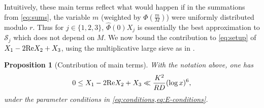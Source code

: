 \documentclass[reqno,11pt]{amsart}
\newtheorem{proposition}[theorem]{Proposition}
\theoremstyle{definition}
\theoremstyle{remark}
\numberwithin{equation}{section}
\newcommand{\mS}{\mathcal{S}}
\renewcommand{\Re}{\textnormal{Re}}
\renewcommand{\hat}{\widehat}
\begin{document}
Intuitively, these main terms reflect what would happen if in the summations from \cref{eq:sums}, the variable $m$ (weighted by $\Phi\left(\frac{m}{M}\right)$) were uniformly distributed modulo $r$. Thus for $j \in \{1, 2, 3\}$, $\hat{\Phi}(0)X_j$ is essentially the best approximation to $\mS_j$ which does not depend on $M$. We now bound the contribution to \cref{eq:setup} of $X_1 - 2\Re X_2 + X_3$, using the multiplicative large sieve as in \cite{drappeau2015theoremes,drappeau2017smooth}.

\begin{proposition}[Contribution of main terms] \label{prop:main-terms}
With the notation above, one has
\[
    0 \le X_1 - 2\Re X_2 + X_3 \ll \frac{K^2}{RD} (\log x)^6,
\]
under the parameter conditions in \cref{eq:conditions,eq:E-conditions}.
\end{proposition}
\end{document}
